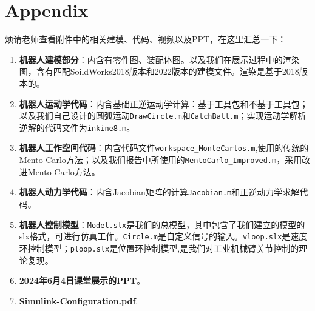 \documentclass[12pt]{ctexart}
\begin{document}
\section{Appendix}
烦请老师查看附件中的相关建模、代码、视频以及PPT，在这里汇总一下：
\begin{enumerate}
    \item \textbf{机器人建模部分}：内含有零件图、装配体图。以及我们在展示过程中的渲染图，含有匹配SoildWorks2018版本和2022版本的建模文件。渲染是基于2018版本的。
    \item \textbf{机器人运动学代码}：内含基础正逆运动学计算：基于工具包和不基于工具包；以及我们自己设计的圆弧运动\verb|DrawCircle.m|和\verb|CatchBall.m|；实现运动学解析逆解的代码文件为\verb|inkine8.m|。
    \item \textbf{机器人工作空间代码}：内含代码文件\verb|workspace_MonteCarlos.m|,使用的传统的Mento-Carlo方法；以及我们报告中所使用的\verb|MentoCarlo_Improved.m|，采用改进Mento-Carlo方法。
    \item \textbf{机器人动力学代码}：内含Jacobian矩阵的计算\verb|Jacobian.m|和正逆动力学求解代码。
    \item \textbf{机器人控制模型}：\verb|Model.slx|是我们的总模型，其中包含了我们建立的模型的slx格式，可进行仿真工作。\verb|Circle.m|是自定义信号的输入。\verb|vloop.slx|是速度环控制模型；\verb|ploop.slx|是位置环控制模型,是我们对工业机械臂关节控制的理论复现。
    \item \textbf{2024年6月4日课堂展示的PPT}。
    \item \textbf{Simulink-Configuration.pdf}.
\end{enumerate}
\end{document}
